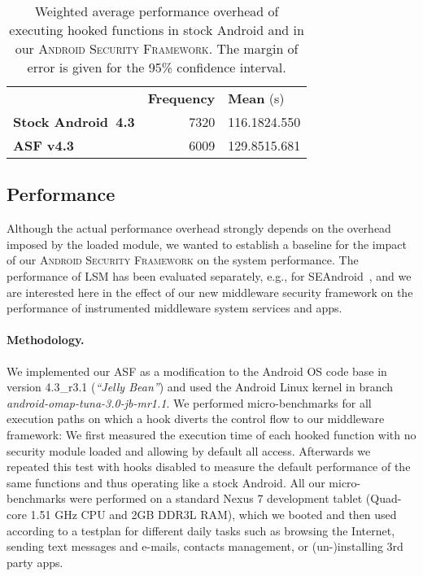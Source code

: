 \documentclass[letterpaper,twocolumn,10pt]{article}
\newcommand{\OURNAME}{\textsc{Android Security Framework}\xspace}
\newcommand{\OURSHORT}{\textsc{ASF}\xspace}
\begin{document}
\begin{table}[t]
  \centering
  \small
  \begin{tabular}{|p{3cm}|r|l|}\cline{2-3}
    \multicolumn{1}{c|}{} & \textbf{Frequency} & \textbf{Mean} (s)\\\cline{1-3}
    \textbf{Stock Android~4.3} & 7320 & 116.1824.550\\\hline
\textbf{\OURSHORT v4.3} & 6009 & 129.8515.681\\\hline
  \end{tabular}
  \caption{Weighted average performance overhead of executing
    hooked functions in stock Android and in our \OURNAME. The
    margin of error is given for the 95\% confidence interval.}
  \label{table:eval:averageperformance}
\end{table}

\subsection{Performance}
\label{sec:eval:performance}

Although the actual performance overhead strongly depends on the overhead imposed by the loaded module, we wanted to establish a baseline for the impact of our \OURNAME on the system performance. The performance of LSM has been evaluated separately, e.g., for SEAndroid~\cite{Smalley2013}, and we are interested here in the effect of our new middleware security framework on the performance of instrumented middleware system services and apps.

\paragraph{Methodology.}
We implemented our \OURSHORT as a modification to the Android OS code base in version 4.3\_r3.1 (\textit{``Jelly Bean''}) and used the Android Linux kernel in branch \textit{android-omap-tuna-3.0-jb-mr1.1}. We performed micro-benchmarks for all execution paths on which a hook diverts the control flow to our middleware framework: We first measured the execution time of each hooked function with no security module loaded and allowing by default all access. Afterwards we repeated this test with hooks disabled to measure the default performance of the same functions and thus operating like a stock Android. All our micro-benchmarks were performed on a standard Nexus 7 development tablet (Quad-core 1.51 GHz CPU and 2GB DDR3L RAM), which we booted and then used according to a testplan for different daily tasks such as browsing the Internet, sending text messages and e-mails, contacts management, or (un-)installing 3rd party apps.
\end{document}
